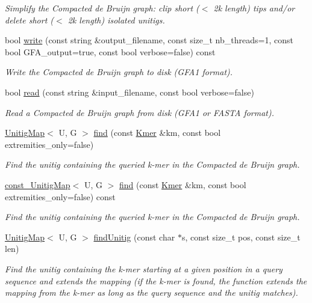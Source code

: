 \begin{DoxyCompactItemize}
\begin{DoxyCompactList}\small\item\em Simplify the Compacted de Bruijn graph\+: clip short ($<$ 2k length) tips and/or delete short ($<$ 2k length) isolated unitigs. \end{DoxyCompactList}\item 
bool \hyperlink{classCompactedDBG_a15707e8624006d247e58e4c67718a677}{write} (const string \&output\+\_\+filename, const size\+\_\+t nb\+\_\+threads=1, const bool G\+F\+A\+\_\+output=true, const bool verbose=false) const
\begin{DoxyCompactList}\small\item\em Write the Compacted de Bruijn graph to disk (G\+F\+A1 format). \end{DoxyCompactList}\item 
bool \hyperlink{classCompactedDBG_a0930cb63a158caa70f4dcd425a088fb4}{read} (const string \&input\+\_\+filename, const bool verbose=false)
\begin{DoxyCompactList}\small\item\em Read a Compacted de Bruijn graph from disk (G\+F\+A1 or F\+A\+S\+TA format). \end{DoxyCompactList}\item 
\hyperlink{classUnitigMap}{Unitig\+Map}$<$ U, G $>$ \hyperlink{classCompactedDBG_ad7c880affe4d79ec249f9384da1d3d65}{find} (const \hyperlink{classKmer}{Kmer} \&km, const bool extremities\+\_\+only=false)
\begin{DoxyCompactList}\small\item\em Find the unitig containing the queried k-\/mer in the Compacted de Bruijn graph. \end{DoxyCompactList}\item 
\hyperlink{CompactedDBG_8hpp_a631369597e56604279ba89a211c14fd0}{const\+\_\+\+Unitig\+Map}$<$ U, G $>$ \hyperlink{classCompactedDBG_acca2582e9bf7abd1f2fdd15223d5b80a}{find} (const \hyperlink{classKmer}{Kmer} \&km, const bool extremities\+\_\+only=false) const
\begin{DoxyCompactList}\small\item\em Find the unitig containing the queried k-\/mer in the Compacted de Bruijn graph. \end{DoxyCompactList}\item 
\hyperlink{classUnitigMap}{Unitig\+Map}$<$ U, G $>$ \hyperlink{classCompactedDBG_ac28279d78c552001464ac76587359445}{find\+Unitig} (const char $\ast$s, const size\+\_\+t pos, const size\+\_\+t len)
\begin{DoxyCompactList}\small\item\em Find the unitig containing the k-\/mer starting at a given position in a query sequence and extends the mapping (if the k-\/mer is found, the function extends the mapping from the k-\/mer as long as the query sequence and the unitig matches). \end{DoxyCompactList}\item 

\end{DoxyCompactItemize}
